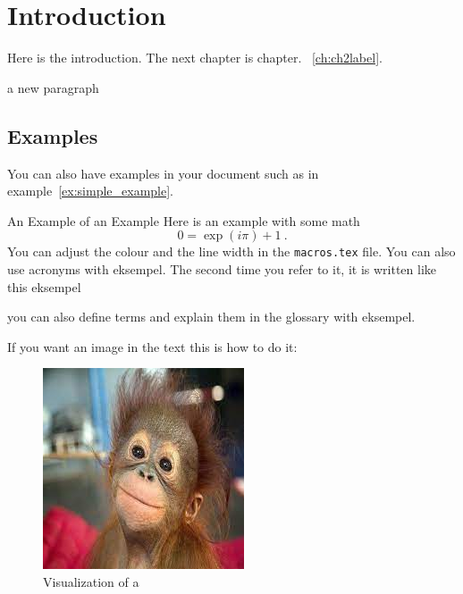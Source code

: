 \vspace{-2cm}
\chapter{Introduction}\label{ch:introduction}

Here is the introduction. The next chapter is chapter. ~\ref{ch:ch2label}.

a new paragraph

\section{Examples}
You can also have examples in your document such as in example~\ref{ex:simple_example}.
\begin{example}{An Example of an Example}
    \label{ex:simple_example}
    Here is an example with some math
    \begin{equation}
        0 = \exp(i\pi)+1\ .
    \end{equation}
    You can adjust the colour and the line width in the {\tt macros.tex} file.
    You can also use acronyms with \ac{eksempel}. The second time you refer to it, it is written like this \ac{eksempel}
  
    you can also define terms and explain them in the glossary with \gls{eksempel}.
    \vspace{0.5cm}
\end{example}


If you want an image in the text this is how to do it:
\begin{figure}[H] %
    \centering
    \includegraphics[width=0.25\linewidth]{media/Example monki.jpg}
    \caption{Visualization of a }
    \label{fig:monki}
\end{figure}


